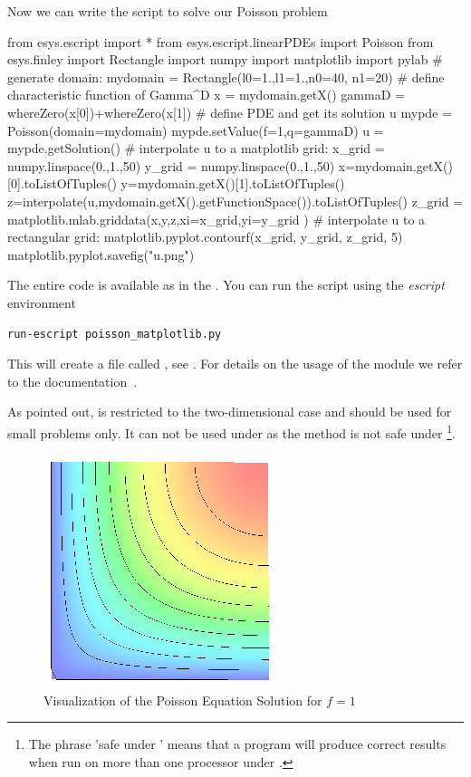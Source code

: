 Now we can write the script to solve our Poisson problem
\begin{python}
  from esys.escript import *
  from esys.escript.linearPDEs import Poisson
  from esys.finley import Rectangle
  import numpy
  import matplotlib
  import pylab
  # generate domain:
  mydomain = Rectangle(l0=1.,l1=1.,n0=40, n1=20)
  # define characteristic function of Gamma^D
  x = mydomain.getX()
  gammaD = whereZero(x[0])+whereZero(x[1])
  # define PDE and get its solution u
  mypde = Poisson(domain=mydomain)
  mypde.setValue(f=1,q=gammaD)
  u = mypde.getSolution()
  # interpolate u to a matplotlib grid:
  x_grid = numpy.linspace(0.,1.,50)
  y_grid = numpy.linspace(0.,1.,50)
  x=mydomain.getX()[0].toListOfTuples()
  y=mydomain.getX()[1].toListOfTuples()
  z=interpolate(u,mydomain.getX().getFunctionSpace()).toListOfTuples()
  z_grid = matplotlib.mlab.griddata(x,y,z,xi=x_grid,yi=y_grid )
  # interpolate u to a rectangular grid:
  matplotlib.pyplot.contourf(x_grid, y_grid, z_grid, 5)
  matplotlib.pyplot.savefig("u.png")
\end{python}
The entire code is available as  in the \ExampleDirectory.
You can run the script using the {\it escript} environment
\begin{verbatim}
run-escript poisson_matplotlib.py
\end{verbatim}
This will create a file called , see .
For details on the usage of the \MATPLOTLIB module we refer to the documentation~\cite{matplotlib}.

As pointed out, \MATPLOTLIB is restricted to the two-dimensional case and
should be used for small problems only.
It can not be used under \MPI as the  method is not
safe under \MPI\footnote{The phrase 'safe under \MPI' means that a program
will produce correct results when run on more than one processor under \MPI.}.

\begin{figure}
\centerline{\includegraphics[width=\figwidth]{FirstStepResult}}
\caption{Visualization of the Poisson Equation Solution for $f=1$}
\label{fig:FirstSteps.3}
\end{figure}


